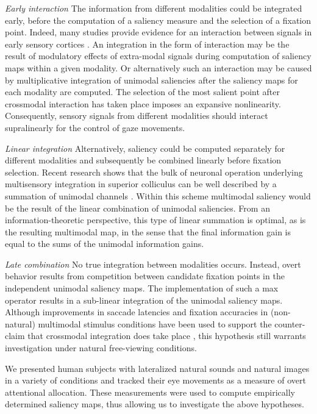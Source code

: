 \textit{Early interaction} \textemdash The information from different
modalities could be integrated early, before the computation of a saliency
measure and the selection of a fixation point. Indeed, many studies provide
evidence for an interaction between signals in early sensory cortices
\citep{calvert2000a, kayser2005b}. An integration in the form of
interaction may be the result of modulatory effects of extra-modal signals
during computation of saliency maps within a given modality. Or
alternatively such an interaction may be caused by multiplicative
integration of unimodal saliencies after the saliency maps for each
modality are computed. The selection of the most salient point after
crossmodal interaction has taken place imposes an expansive nonlinearity.
Consequently, sensory signals from different modalities should interact
supralinearly for the control of gaze movements. 

\textit{Linear integration} \textemdash Alternatively, saliency could be
computed separately for different modalities and subsequently be combined
linearly before fixation selection. Recent research shows that the bulk of
neuronal operation underlying multisensory integration in superior
colliculus can be well described by a summation of unimodal channels
\citep{stanford2005a}. Within this scheme multimodal saliency would be the
result of the linear combination of unimodal saliencies. From an
information-theoretic perspective, this type of linear summation is
optimal, as is the resulting multimodal map, in the sense that the final
information gain is equal to the sums of the unimodal information gains. 

\textit{Late combination} \textemdash No true integration between
modalities occurs. Instead, overt behavior results from competition between
candidate fixation points in the independent unimodal saliency maps. The
implementation of such a max operator results in a sub-linear integration
of the unimodal saliency maps. Although improvements in saccade latencies
and fixation accuracies in (non-natural) multimodal stimulus conditions
have been used to support the counter-claim that crossmodal integration
does take place \citep{corneil2002a, arndt2003a}, this hypothesis still
warrants investigation under natural free-viewing conditions.

We presented human subjects with lateralized natural sounds and natural
images in a variety of conditions and tracked their eye movements as a
measure of overt attentional allocation. These measurements were used to
compute empirically determined saliency maps, thus allowing us to
investigate the above hypotheses. 

